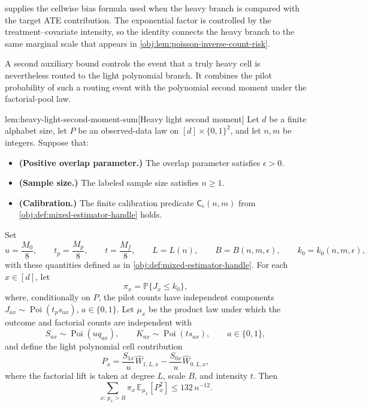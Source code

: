 \documentclass[11pt]{article}
\begin{document}
 supplies the cellwise bias formula used when the heavy branch is compared with the target ATE contribution. The exponential factor is controlled by the treatment--covariate intensity, so the identity connects the heavy branch to the same marginal scale that appears in \cref{obj:lem:poisson-inverse-count-risk}.

A second auxiliary bound controls the event that a truly heavy cell is nevertheless routed to the light polynomial branch. It combines the pilot probability of such a routing event with the polynomial second moment under the factorial-pool law.

\begin{lemmav}{lem:heavy-light-second-moment-sum}[Heavy light second moment]
Let \(d\) be a finite alphabet size, let \(P\) be an observed-data law on \([d]\times\{0,1\}^2\), and let \(n,m\) be integers. Suppose that:
\begin{itemize}
\item \textbf{(Positive overlap parameter.)} The overlap parameter satisfies \(\epsilon>0\).
\item \textbf{(Sample size.)} The labeled sample size satisfies \(n\ge1\).
\item \textbf{(Calibration.)} The finite calibration predicate \(\mathsf C_\epsilon(n,m)\) from \cref{obj:def:mixed-estimator-handle} holds.
\end{itemize}
Set
\[
u=\frac{M_0}{8},\qquad
t_p=\frac{M_p}{8},\qquad
t=\frac{M_f}{8},\qquad
L=L(n),\qquad
B=B(n,m,\epsilon),\qquad
k_0=k_0(n,m,\epsilon),
\]
with these quantities defined as in \cref{obj:def:mixed-estimator-handle}. For each \(x\in[d]\), let
\[
\pi_x
=
\mathbb P\{J_x\le k_0\},
\]
where, conditionally on \(P\), the pilot counts have independent components
\(J_{ax}\sim\operatorname{Poi}(t_p s_{ax})\), \(a\in\{0,1\}\). Let \(\mu_x\) be the product law under which the outcome and factorial counts are independent with
\[
S_{ax}\sim\operatorname{Poi}(u q_{ax}),
\qquad
K_{ax}\sim\operatorname{Poi}(t s_{ax}),
\qquad a\in\{0,1\},
\]
and define the light polynomial cell contribution
\[
P_x
=
\frac{S_{1x}}{u}\widehat W_{1,L,x}
-
\frac{S_{0x}}{u}\widehat W_{0,L,x},
\]
where the factorial lift is taken at degree \(L\), scale \(B\), and intensity \(t\). Then
\[
\sum_{x:\,p_x>B}\pi_x\,\mathbb E_{\mu_x}\!\left[P_x^2\right]
\le
132\,n^{-12}.
\]
\end{lemmav}
\end{document}
